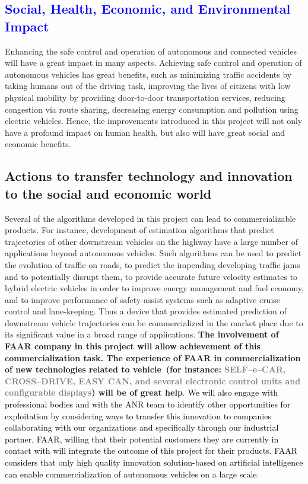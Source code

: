\documentclass[a4paper,11pt]{article}
\begin{document}
%
%
\subsection{\textcolor{blue}{Social, Health, Economic, and Environmental Impact}}

Enhancing the safe control and operation of autonomous and connected vehicles will have a great impact in many aspects. Achieving safe control and operation of autonomous vehicles has great benefits, such as minimizing traffic accidents by taking humans out of the driving task, improving the lives of citizens with low physical mobility by providing door-to-door transportation services, reducing congestion via route sharing, decreasing energy consumption and pollution using electric vehicles.  Hence, the improvements introduced in this project will not only have a profound impact on human health, but also will have great social and economic benefits.



\subsection{Actions to transfer technology and innovation to the social and economic world}
%
Several of the algorithms developed in this project can lead to commercializable products.  For instance, development of estimation algorithms that predict trajectories of other downstream vehicles on the highway have a large number of applications beyond autonomous vehicles.  Such algorithms can be used to predict the evolution of traffic on roads, to predict the impending developing traffic jams and to potentially disrupt them, to provide accurate future velocity estimates to hybrid electric vehicles in order to improve energy management and fuel economy, and to improve performance of safety-assist systems such as adaptive cruise control and lane-keeping.  Thus a device that provides estimated prediction of downstream vehicle trajectories can be commercialized in the market place due to its significant value in a broad range of applications. {\bf The involvement of FAAR company in this project will allow achievement of this commercialization task. The experience of FAAR in commercialization of new technologies related to vehicle~(for instance: \textcolor{gray}{SELF--e--CAR, CROSS--DRIVE, EASY CAN, and several electronic control units and configurable displays}) will be of great help}. \textcolor{black}{We will also engage with professional bodies and with the ANR team to identify other opportunities for exploitation by considering ways to transfer this innovation to companies collaborating with our organizations and specifically through our industrial partner, FAAR, willing that their potential customers they are currently in contact with will integrate the outcome of this project for their products. FAAR considers that only high quality innovation solution-based on artificial intelligence can enable commercialization of autonomous vehicles on a large scale.} 
\end{document}
